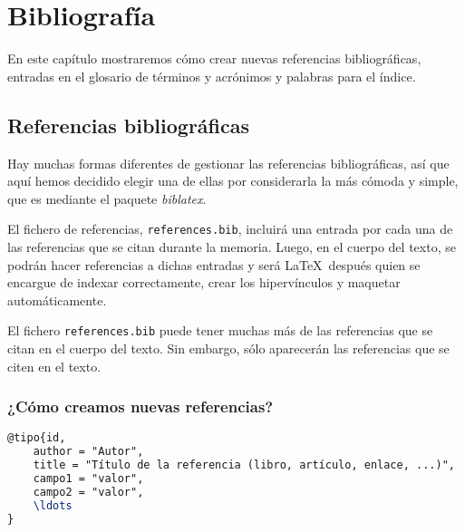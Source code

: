 \chapter{Bibliografía}
\label{ch:Bibliografia}

En este capítulo mostraremos cómo crear nuevas referencias bibliográficas, entradas en el glosario de términos y acrónimos y palabras para el índice.

\section{Referencias bibliográficas}
\label{s:referencias-bibliograficas}

Hay muchas formas diferentes de gestionar las referencias bibliográficas, así que aquí hemos decidido elegir una de ellas por considerarla la más cómoda y simple, que es mediante el paquete \textit{biblatex}.

El fichero de referencias, \texttt{references.bib}, incluirá una entrada por cada una de las referencias que se citan durante la memoria. Luego, en el cuerpo del texto, se podrán hacer referencias a dichas entradas y será \LaTeX~después quien se encargue de indexar correctamente, crear los hipervínculos y maquetar automáticamente.

El fichero \texttt{references.bib} puede tener muchas más de las referencias que se citan en el cuerpo del texto. Sin embargo, sólo aparecerán las referencias que se citen en el texto.

 
\subsection{¿Cómo creamos nuevas referencias?}



\begin{lstlisting}[language=tex,caption=Estructura general de una referencia]
@tipo{id,
    author = "Autor",
    title = "Título de la referencia (libro, artículo, enlace, ...)",
    campo1 = "valor",
    campo2 = "valor",
    \ldots
}
\end{lstlisting}


